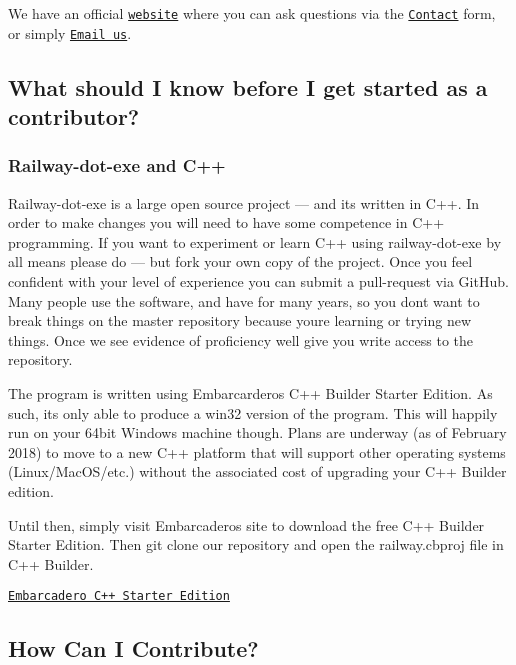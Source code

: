 We have an official \href{http://www.railwayoperationsimulator.com}{\tt website} where you can ask questions via the \href{http://www.railwayoperationsimulator.com/contact}{\tt Contact} form, or simply \href{mailto:railwayfeedback@gmail.com}{\tt Email us}.

\subsection*{What should I know before I get started as a contributor?}

\subsubsection*{Railway-\/dot-\/exe and C++}

Railway-\/dot-\/exe is a large open source project --- and it\textquotesingle{}s written in C++. In order to make changes you will need to have some competence in C++ programming. If you want to experiment or learn C++ using railway-\/dot-\/exe by all means please do --- but fork your own copy of the project. Once you feel confident with your level of experience you can submit a pull-\/request via Git\+Hub. Many people use the software, and have for many years, so you don\textquotesingle{}t want to break things on the master repository because you\textquotesingle{}re learning or trying new things. Once we see evidence of proficiency we\textquotesingle{}ll give you write access to the repository.

The program is written using Embarcardero\textquotesingle{}s C++ Builder Starter Edition. As such, it\textquotesingle{}s only able to produce a win32 version of the program. This will happily run on your 64bit Windows machine though. Plans are underway (as of February 2018) to move to a new C++ platform that will support other operating systems (Linux/\+Mac\+O\+S/etc.) without the associated cost of upgrading your C++ Builder edition.

Until then, simply visit Embarcadero\textquotesingle{}s site to download the free C++ Builder Starter Edition. Then {\ttfamily git clone} our repository and open the railway.\+cbproj file in C++ Builder.


\begin{DoxyItemize}
\item \href{https://www.embarcadero.com/products/cbuilder/start-for-free}{\tt Embarcadero C++ Starter Edition}
\end{DoxyItemize}

\subsection*{How Can I Contribute?}

